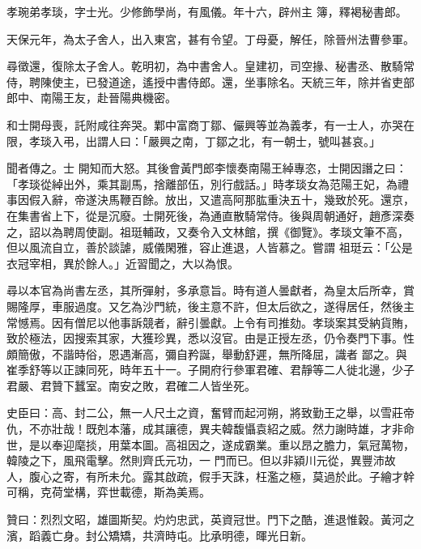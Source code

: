 \begin{pinyinscope}
 孝琬弟孝琰，字士光。少修飾學尚，有風儀。年十六，辟州主
 簿，釋褐秘書郎。



 天保元年，為太子舍人，出入東宮，甚有令望。丁母憂，解任，除晉州法曹參軍。



 尋徵還，復除太子舍人。乾明初，為中書舍人。皇建初，司空掾、秘書丞、散騎常侍，聘陳使主，已發道途，遙授中書侍郎。還，坐事除名。天統三年，除并省吏部郎中、南陽王友，赴晉陽典機密。



 和士開母喪，託附咸往奔哭。鄴中富商丁鄒、儼興等並為義孝，有一士人，亦哭在限，孝琰入弔，出謂人曰：「嚴興之南，丁鄒之北，有一朝士，號叫甚哀。」



 聞者傳之。士
 開知而大怒。其後會黃門郎李懷奏南陽王綽專恣，士開因譖之曰：「孝琰從綽出外，乘其副馬，捨離部伍，別行戲話。」時孝琰女為范陽王妃，為禮事因假入辭，帝遂決馬鞭百餘。放出，又遣高阿那肱重決五十，幾致於死。還京，在集書省上下，從是沉廢。士開死後，為通直散騎常侍。後與周朝通好，趙彥深奏之，詔以為聘周使副。祖珽輔政，又奏令入文林館，撰《御覽》。孝琰文筆不高，但以風流自立，善於談謔，威儀閑雅，容止進退，人皆慕之。嘗謂
 祖珽云：「公是衣冠宰相，異於餘人。」近習聞之，大以為恨。



 尋以本官為尚書左丞，其所彈射，多承意旨。時有道人曇獻者，為皇太后所幸，賞賜隆厚，車服過度。又乞為沙門統，後主意不許，但太后欲之，遂得居任，然後主常憾焉。因有僧尼以他事訴競者，辭引曇獻。上令有司推劾。孝琰案其受納貨賄，致於極法，因搜索其家，大獲珍異，悉以沒官。由是正授左丞，仍令奏門下事。性頗簡傲，不諧時俗，恩遇漸高，彌自矜誕，舉動舒遲，無所降屈，識者
 鄙之。與崔季舒等以正諫同死，時年五十一。子開府行參軍君確、君靜等二人徙北邊，少子君嚴、君贊下蠶室。南安之敗，君確二人皆坐死。



 史臣曰：高、封二公，無一人尺土之資，奮臂而起河朔，將致勤王之舉，以雪莊帝仇，不亦壯哉！既剋本藩，成其讓德，異夫韓馥懾袁紹之威。然力謝時雄，才非命世，是以奉迎麾掞，用葉本圖。高祖因之，遂成霸業。重以昂之膽力，氣冠萬物，韓陵之下，風飛電擊。然則齊氏元功，一
 門而已。但以非潁川元從，異豐沛故人，腹心之寄，有所未允。露其啟疏，假手天誅，枉濫之極，莫過於此。子繪才幹可稱，克荷堂構，弈世載德，斯為美焉。



 贊曰：烈烈文昭，雄圖斯契。灼灼忠武，英資冠世。門下之酷，進退惟穀。黃河之濱，蹈義亡身。封公矯矯，共濟時屯。比承明德，暉光日新。



\end{pinyinscope}